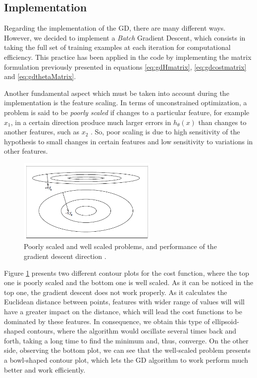 \documentclass[a4paper, report, oneside, UKenglish]{memoir}
\begin{document}
\subsection{Implementation}

Regarding the implementation of the GD, there are many different ways. However, we decided to implement a \textit{Batch} Gradient Descent, which consists in taking the full set of training examples at each iteration for computational efficiency. This practice has been applied in the code by implementing the matrix formulation previously presented in equations \eqref{eq:gdHmatrix}, \eqref{eq:gdcostmatrix} and \eqref{eq:gdthetaMatrix}.

Another fundamental aspect which must be taken into account during the implementation is the feature scaling. In terms of unconstrained optimization, a problem is said to be \textit{poorly scaled} if changes to a particular feature, for example $x_{1}$, in a certain direction produce much larger errors in $h_\theta(x)$ than changes to another features, such as $x_{2}$ \cite{numericalopt}. So, poor scaling is due to high sensitivity of the hypothesis to small changes in certain features and low sensitivity to variations in other features. 

\begin{figure}[hbt]
    \centering
    \includegraphics[width=0.6\textwidth]{fitting/PoorScaling_GradDesc.PNG}
    \caption{Poorly scaled and well scaled problems, and performance of the gradient descent direction \cite{numericalopt}.}
    \label{fig:scaling_gd}
\end{figure}

Figure \ref{fig:scaling_gd} presents two different contour plots for the cost function, where the top one is poorly scaled and the bottom one is well scaled. As it can be noticed in the top one, the gradient descent does not work properly. As it calculates the Euclidean distance between points, features with wider range of values will will have a greater impact on the distance, which will lead the cost functions to be dominated by these features. In consequence, we obtain this type of ellipsoid-shaped contours, where the algorithm would oscillate several times back and forth, taking a long time to find the minimum and, thus, converge. On the other side, observing the bottom plot, we can see that the well-scaled problem presents a bowl-shaped contour plot, which lets the GD algorithm to work perform much better and work efficiently.  
\end{document}

